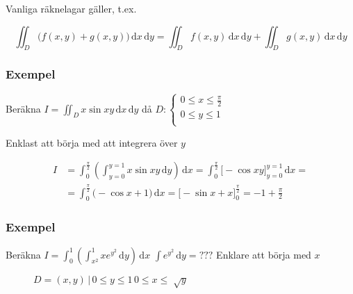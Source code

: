 \documentclass[a4paper]{article}
\let\oldsqrt\sqrt
\renewcommand*{\sqrt}[2][\ ]{\oldsqrt[#1]{#2} }
\begin{document}
Vanliga räknelagar gäller, t.ex. 

$$
	\iint_D \Big(f(x,y)+g(x,y)\Big) \,\mathrm{d}x\,\mathrm{d}y = \iint_D f(x,y) \,\mathrm{d}x\,\mathrm{d}y + \iint_D g(x,y) \,\mathrm{d}x\,\mathrm{d}y
$$

\newpage
\subsubsection{Exempel}
Beräkna $I = \iint_D x\sin{xy} \,\mathrm{d}x\,\mathrm{d}y$   då $D: 
\begin{cases}
	0 \leq x \leq \frac{\pi}{2} \\
	0 \leq y \leq 1 \\
\end{cases}$

Enklast att börja med att integrera över $y$

\begin{align*}
	I &= \int_0^{\frac{\pi}{2}} \left(\int_{y=0}^{y=1} x\sin{xy} \,\mathrm{d}y \right) \,\mathrm{d}x = \int_0^{\frac{\pi}{2}} \Bigg[ -\cos{xy} \Bigg]_{y=0}^{y=1} \,\mathrm{d}x = \\
	  &= \int_0^{\frac{\pi}{2}} \Bigg( -\cos{x} + 1 \Bigg) \,\mathrm{d}x = \Bigg[ -\sin{x} + x \Bigg]_0^{\frac{\pi}{2}} = -1 + \frac{\pi}{2}
\end{align*}

\subsubsection{Exempel}
Beräkna $I = \int_0^1 \left( \int_{x^2}^1 xe^{y^2} \,\mathrm{d}y \right) \,\mathrm{d}x$    $\int e^{y^2} \,\mathrm{d}y = ???$ Enklare att börja med $x$

\begin{figure}[ht] 
  \caption{$D={(x,y) \, | \, 0 \leq y \leq 1 \, 0 \leq x \leq \sqrt{y}}$} \label{fig:9.4}
\end{figure}
\end{document}

